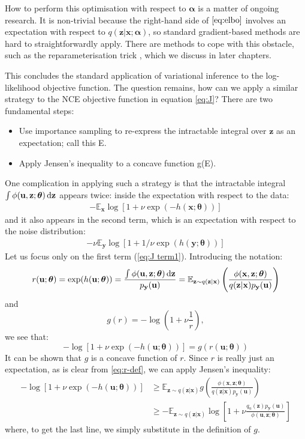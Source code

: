 \documentclass[11pt, oneside]{article}
\newcommand{\thetab}{{\boldsymbol{\theta}}}
\newcommand{\alphab}{{\boldsymbol{\alpha}}}
\newcommand{\pnn}{\phi}
\newcommand{\pnoise}{p_{ \mathbf y}}
\newcommand{\q}[1]{q(\z|{#1})}
\renewcommand{\u}{{\mathbf u}}
\newcommand{\x}{{\mathbf x}}
\newcommand{\y}{{\mathbf y}}
\newcommand{\z}{{\mathbf z}}
\newcommand{\E}{\mathbb{E}}
\newcommand{\Ex}{\E_{\x}}
\newcommand{\Ey}{\E_{\y}}
\newcommand{\Evar}[1]{\E_{\z \sim \q{#1}}}
\begin{document}
How to perform this optimisation with respect to $\alphab$ is a matter of ongoing research. It is non-trivial because the right-hand side of $\ref{eq:elbo}$ involves an expectation with respect to $q(\z|\x; \alphab)$, so standard gradient-based methods are hard to straightforwardly apply. There are methods to cope with this obstacle, such as the reparameterisation trick \citep{kingma2015variational}, which we discuss in later chapters. 

This concludes the standard application of variational inference to the log-likelihood objective function. The question remains, how can we apply a similar strategy to the NCE objective function in equation \ref{eq:J}? There are two fundamental steps: 
\begin{itemize}
    \item Use importance sampling to re-express the intractable integral over $\z$ as an expectation; call this E.
    \item Apply Jensen’s inequality to a concave function g(E).
\end{itemize}
One complication in applying such a strategy is that the intractable integral $\int \pnn(\u, \z;\thetab) \dif \z$ appears twice: inside the expectation with respect to the data:
\begin{align}
    - \Ex  \log \left[1+\nu \exp(-h(\x;\thetab))\right]
    \label{eq:J term1}
\end{align}
and it also appears in the second term, which is an expectation with respect to the noise distribution:
\begin{align}
    - \nu \Ey \log \left[1+1/\nu \exp(h(\y;\thetab))\right]
    \label{eq:J term2}
\end{align}
Let us focus only on the first term (\ref{eq:J term1}). Introducing the notation:
\begin{equation}
  r(\u;\thetab) = \exp(h(\u; \thetab)) = \frac{\int \pnn(\u, \z;\thetab) \dif \z}{\pnoise(\u)} = \Evar{\x} \left( \frac{\pnn(\x, \z;\thetab)}{\q{\x}\pnoise(\u)} \right)
  \label{eq:r-def}
\end{equation}
and
\begin{equation}
  g(r) = -\log \left(1+\nu \frac{1}{r} \right),
\end{equation}
we see that:
\begin{equation}
  - \log [1+\nu \exp(-h(\u;\thetab))]  =   g(r(\u; \thetab))
\end{equation}
It can be shown that $g$ is a concave function of $r$. Since $r$ is really just an expectation, as is clear from \ref{eq:r-def}, we can apply Jensen's inequality:
\begin{align}
  - \log [1+\nu \exp(-h(\u;\thetab))]  &\geq   \Evar{\x} g \left( \frac{\pnn(\x, \z;\thetab)}{\q{\x}\pnoise(\u)} \right) \\
    &\geq -\Evar{\x} \log \left[1+\nu \frac{q_u(\z)\pnoise(\u)}{\pnn(\u,\z; \thetab)}\right]
\end{align}
where, to get the last line, we simply substitute in the definition of $g$.
\end{document}
